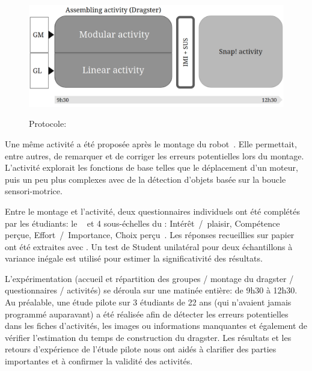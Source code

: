                \begin{figure}[!h]
                    \centering\label{fig:drag_proto}
                    \includegraphics[width=0.9\linewidth]{Figures/Gilliard-proto.png}
                    \caption{Protocole: }
                \end{figure}
                Une même activité a été proposée après le montage du robot~. Elle permettait, entre autres, de remarquer et de corriger les erreurs potentielles lors du montage. L'activité explorait les fonctions de base telles que le déplacement d'un moteur, puis un peu plus complexes avec de la détection d'objets basée sur la boucle sensori-motrice.\par%
                Entre le montage et l'activité, deux questionnaires individuels ont été complétés par les étudiants: le ~ et 4 sous-échelles du : Intérêt~/~plaisir, Compétence perçue, Effort~/~Importance, Choix perçu~. Les réponses recueillies sur papier ont été extraites avec . Un test de Student unilatéral pour deux échantillons à variance inégale est utilisé pour estimer la significativité des résultats.\par%
                L'expérimentation (accueil et répartition des groupes / montage du dragster / questionnaires / activités) se déroula sur une matinée entière: de 9h30 à 12h30.
                Au préalable, une étude pilote sur 3 étudiants de 22 ans (qui n’avaient jamais programmé auparavant) a été réalisée afin de détecter les erreurs potentielles dans les fiches d’activités, les images ou informations manquantes et également de vérifier l'estimation du temps de construction du dragster. Les résultats et les retours d'expérience de l'étude pilote nous ont aidés à clarifier des parties importantes et à confirmer la validité des activités.
